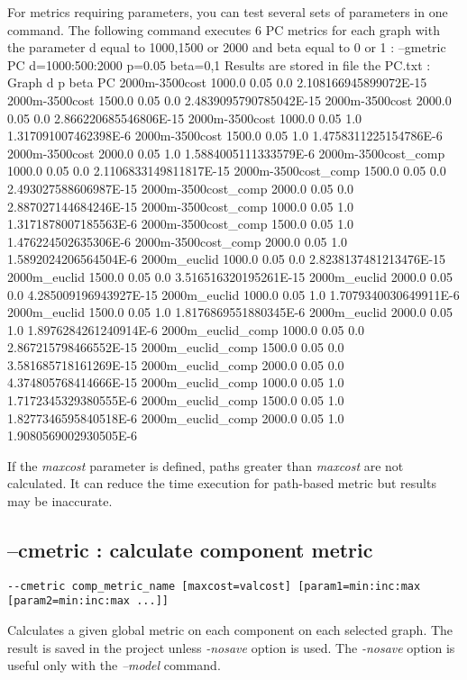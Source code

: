 \documentclass[a4paper,10pt]{report}
\newenvironment{cmd}
{\quote\Verbatim}
{\endVerbatim\endquote}
\begin{document}
For metrics requiring parameters, you can test several sets of parameters in one command. 
The following command executes 6 PC metrics for each graph with the parameter d equal to 1000,1500 or 2000 and beta equal to 0 or 1 :
\begin{cmd}
--gmetric PC d=1000:500:2000 p=0.05 beta=0,1
\end{cmd}
Results are stored in file the PC.txt :
\begin{cmd}
Graph               d     	p   	beta	PC
2000m-3500cost      1000.0	0.05	0.0	2.108166945899072E-15
2000m-3500cost      1500.0	0.05	0.0	2.4839095790785042E-15
2000m-3500cost      2000.0	0.05	0.0	2.866220685546806E-15
2000m-3500cost      1000.0	0.05	1.0	1.317091007462398E-6
2000m-3500cost      1500.0	0.05	1.0	1.4758311225154786E-6
2000m-3500cost      2000.0	0.05	1.0	1.5884005111333579E-6
2000m-3500cost_comp 1000.0	0.05	0.0	2.1106833149811817E-15
2000m-3500cost_comp 1500.0	0.05	0.0	2.493027588606987E-15
2000m-3500cost_comp 2000.0	0.05	0.0	2.887027144684246E-15
2000m-3500cost_comp 1000.0	0.05	1.0	1.3171878007185563E-6
2000m-3500cost_comp 1500.0	0.05	1.0	1.476224502635306E-6
2000m-3500cost_comp 2000.0	0.05	1.0	1.5892024206564504E-6
2000m_euclid        1000.0	0.05	0.0	2.8238137481213476E-15
2000m_euclid        1500.0	0.05	0.0	3.516516320195261E-15
2000m_euclid        2000.0	0.05	0.0	4.285009196943927E-15
2000m_euclid        1000.0	0.05	1.0	1.7079340030649911E-6
2000m_euclid        1500.0	0.05	1.0	1.8176869551880345E-6
2000m_euclid        2000.0	0.05	1.0	1.8976284261240914E-6
2000m_euclid_comp   1000.0	0.05	0.0	2.867215798466552E-15
2000m_euclid_comp   1500.0	0.05	0.0	3.581685718161269E-15
2000m_euclid_comp   2000.0	0.05	0.0	4.374805768414666E-15
2000m_euclid_comp   1000.0	0.05	1.0	1.7172345329380555E-6
2000m_euclid_comp   1500.0	0.05	1.0	1.8277346595840518E-6
2000m_euclid_comp   2000.0	0.05	1.0	1.9080569002930505E-6
\end{cmd}

If the \textit{maxcost} parameter is defined, paths greater than \textit{maxcost} are not calculated. It can reduce the time execution for path-based metric but results may be inaccurate. 

\subsection{--cmetric : calculate component metric}
\begin{verbatim}
--cmetric comp_metric_name [maxcost=valcost] [param1=min:inc:max [param2=min:inc:max ...]]
\end{verbatim}
Calculates a given global metric on each component on each selected graph.
The result is saved in the project unless \textit{-nosave} option is used. The \textit{-nosave} option is useful only with the \textit{--model} command.
\end{document}
